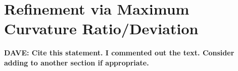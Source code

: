 \section{Refinement via Maximum Curvature Ratio/Deviation}
{\bf{DAVE:  Cite this statement.  I commented out the text.  Consider
adding to another section if appropriate.}}




